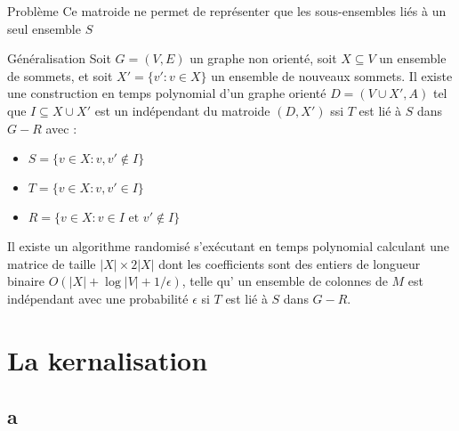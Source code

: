 \documentclass[9pt]{beamer}
\begin{document}
\begin{frame}
    \begin{alertblock}{Problème}
        Ce matroide ne permet de représenter que les sous-ensembles liés à un seul ensemble $S$
    \end{alertblock}

    \pause
    \vfill

    \begin{exampleblock}{Généralisation}
        Soit $G = (V, E)$ un graphe non orienté, soit $X \subseteq V$ un ensemble de sommets, et
        soit $X' = \{v' : v \in X\}$ un ensemble de nouveaux sommets. Il existe une construction
        en temps polynomial d'un graphe orienté $D = (V \cup X', A)$ tel que $I \subseteq X \cup X'$
        est un indépendant du matroide $(D, X')$ ssi $T$ est lié à $S$ dans $G - R$ avec :
        \begin{itemize}
            \item $S = \{v \in X : v, v' \not \in I\}$
            \item $T = \{v \in X : v, v' \in I\}$
            \item $R = \{v \in X : v \in I \mbox{ et } v' \not \in I\}$
        \end{itemize}
    \end{exampleblock}

    \pause
    \vfill

    \begin{rmq}
        Il existe un algorithme randomisé s'exécutant en temps polynomial calculant une matrice de
        taille $|X| \times 2|X|$ dont les coefficients sont des entiers de longueur binaire $O(|X| +
        \log|V| + 1/\epsilon)$, telle qu' un ensemble de colonnes de $M$ est indépendant avec une
        probabilité $\epsilon$ si $T$ est lié à $S$ dans $G - R$.
    \end{rmq}
\end{frame}
\section{La kernalisation}
\subsection*{a}
\end{document}
